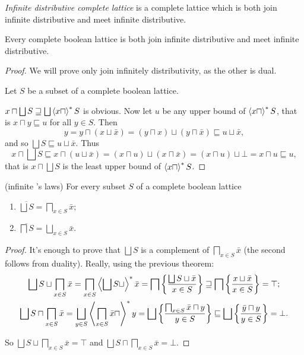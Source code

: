 \begin{defn}
\emph{Infinite distributive complete
lattice} is a complete lattice which is both join infinite distributive
and meet infinite distributive.\end{defn}
\begin{thm}
Every complete boolean lattice is both join infinite distributive
and meet infinite distributive.\end{thm}
\begin{proof}
We will prove only join infinitely distributivity, as the other is
dual.

Let $S$ be a subset of a complete boolean lattice.

$x\sqcap\bigsqcup S\sqsupseteq\bigsqcup\left\langle x\sqcap\right\rangle ^{\ast}S$ is obvious.
Now let \textbf{$u$} be any upper bound of $\left\langle x\sqcap\right\rangle ^{\ast}S$,
that is $x\sqcap y\sqsubseteq u$ for all $y\in S$. Then
\[
y=y\sqcap(x\sqcup\bar{x})=(y\sqcap x)\sqcup(y\sqcap\bar{x})\sqsubseteq u\sqcup\bar{x},
\]
and so $\bigsqcup S\sqsubseteq u\sqcup\bar{x}$. Thus
\[
x\sqcap\bigsqcup S\sqsubseteq x\sqcap(u\sqcup\bar{x})=(x\sqcap u)\sqcup(x\sqcap\bar{x})=(x\sqcap u)\sqcup\bot=x\sqcap u\sqsubseteq u,
\]
that is $x\sqcap\bigsqcup S$ is the least upper bound of $\left\langle x\sqcap\right\rangle ^{\ast}S$.\end{proof}
\begin{thm}
(infinite 's laws) For
every subset $S$ of a complete boolean lattice
\begin{enumerate}
\item $\overline{\bigsqcup S}=\bigsqcap_{x\in S}\bar{x}$;
\item $\overline{\bigsqcap S}=\bigsqcup_{x\in S}\bar{x}$.
\end{enumerate}
\end{thm}
\begin{proof}
It's enough to prove that $\bigsqcup S$ is a complement of $\bigsqcap_{x\in S}\bar{x}$
(the second follows from duality). Really, using the previous theorem:
\begin{gather*}
\bigsqcup S\sqcup\bigsqcap_{x\in S}\bar{x}=\bigsqcap_{x\in S}\left\langle \bigsqcup S\sqcup\right\rangle ^{\ast}\bar{x}=\bigsqcap\left\{ \frac{\bigsqcup S\sqcup\bar{x}}{x\in S}\right\}\sqsupseteq\bigsqcap\left\{ \frac{x\sqcup\bar{x}}{x\in S}\right\}=\top;\\
\bigsqcup S\sqcap\bigsqcap_{x\in S}\bar{x}=\bigsqcup_{y\in S}\left\langle \bigsqcap_{x\in S}\bar{x}\sqcap\right\rangle ^{\ast}y=\bigsqcup\left\{ \frac{\bigsqcap_{x\in S}\bar{x}\sqcap y}{y\in S}\right\}\sqsubseteq\bigsqcup\left\{ \frac{\bar{y}\sqcap y}{y\in S}\right\}=\bot.
\end{gather*}


So $\bigsqcup S\sqcup\bigsqcap_{x\in S}\bar{x}=\top$ and $\bigsqcup S\sqcap\bigsqcap_{x\in S}\bar{x}=\bot$.
\end{proof}

